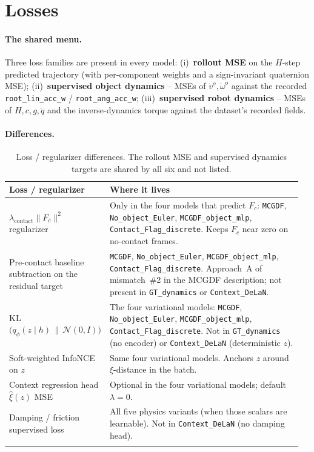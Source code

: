 \documentclass[11pt]{article}
\begin{document}
\section{Losses}

\paragraph{The shared menu.}
Three loss families are present in every model:
(i)~\textbf{rollout MSE} on the $H$-step predicted trajectory (with
per-component weights and a sign-invariant quaternion MSE);
(ii)~\textbf{supervised object dynamics} -- MSEs of
$\dot v^o, \dot \omega^o$ against the recorded
\texttt{root\_lin\_acc\_w} / \texttt{root\_ang\_acc\_w};
(iii)~\textbf{supervised robot dynamics} -- MSEs of $H, c, g, \ddot q$
and the inverse-dynamics torque against the dataset's recorded
fields.

\paragraph{Differences.}
\begin{longtable}{p{0.22\linewidth} p{0.74\linewidth}}
\toprule
Loss / regularizer & Where it lives \\
\midrule
$\lambda_{\mathrm{contact}} \|F_c\|^2$ regularizer       & Only in the four models that predict $F_c$: \texttt{MCGDF}, \texttt{No\_object\_Euler}, \texttt{MCGDF\_object\_mlp}, \texttt{Contact\_Flag\_discrete}.  Keeps $F_c$ near zero on no-contact frames. \\
Pre-contact baseline subtraction on the residual target & \texttt{MCGDF}, \texttt{No\_object\_Euler}, \texttt{MCGDF\_object\_mlp}, \texttt{Contact\_Flag\_discrete}.  Approach~A of mismatch~\#2 in the MCGDF description; not present in \texttt{GT\_dynamics} or \texttt{Context\_DeLaN}. \\
KL$\bigl(q_\phi(z \mid h) \,\|\, \mathcal{N}(0, I)\bigr)$ & The four variational models: \texttt{MCGDF}, \texttt{No\_object\_Euler}, \texttt{MCGDF\_object\_mlp}, \texttt{Contact\_Flag\_discrete}.  Not in \texttt{GT\_dynamics} (no encoder) or \texttt{Context\_DeLaN} (deterministic $z$). \\
Soft-weighted InfoNCE on $z$            & Same four variational models.  Anchors $z$ around $\xi$-distance in the batch. \\
Context regression head $\hat \xi(z)$ MSE & Optional in the four variational models; default $\lambda = 0$. \\
Damping / friction supervised loss      & All five physics variants (when those scalars are learnable).  Not in \texttt{Context\_DeLaN} (no damping head). \\
\bottomrule
\caption{Loss / regularizer differences.  The rollout MSE and
supervised dynamics targets are shared by all six and not listed.}
\label{tab:cmp-loss}
\end{longtable}
\end{document}
